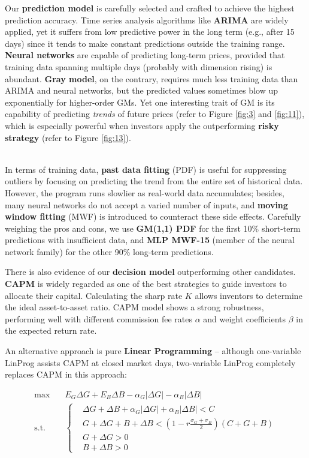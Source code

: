 \documentclass{mcmthesis}
\begin{document}
{	Our \textbf{prediction model} is carefully selected and crafted to achieve the highest prediction accuracy. Time series analysis algorithms like \textbf{ARIMA} are widely applied, yet it suffers from low predictive power in the long term (e.g., after 15 days) since it tends to make constant predictions outside the training range. \textbf{Neural networks} are capable of predicting long-term prices, provided that training data spanning multiple days (probably with dimension rising) is abundant. \textbf{Gray model}, on the contrary, requires much less training data than ARIMA and neural networks, but the predicted values sometimes blow up exponentially for higher-order GMs. Yet one interesting trait of GM is its capability of predicting \textit{trends} of future prices (refer to Figure \ref{fig:3} and \ref{fig:11}), which is especially powerful when investors apply the outperforming \textbf{risky strategy} (refer to Figure \ref{fig:13}). 
	
	~\\
	
	In terms of training data, \textbf{past data fitting} (PDF) is useful for suppressing outliers by focusing on predicting the trend from the entire set of historical data. However, the program runs slowlier as real-world data accumulates; besides, many neural networks do not accept a varied number of inputs, and \textbf{moving window fitting} (MWF) is introduced to counteract these side effects. Carefully weighing the pros and cons, we use \textbf{GM(1,1) PDF} for the first 10\% short-term predictions with insufficient data, and \textbf{MLP MWF-15} (member of the neural network family) for the other 90\% long-term predictions. 
	
	There is also evidence of our \textbf{decision model} outperforming other candidates. \textbf{CAPM} is widely regarded as one of the best strategies to guide investors to allocate their capital. Calculating the sharp rate $K$ allows inventors to determine the ideal asset-to-asset ratio. CAPM model shows a strong robustness, performing well with different commission fee rates $\alpha$ and weight coefficients $\beta$ in the expected return rate. 
	
	An alternative approach is pure \textbf{Linear Programming} -- although one-variable LinProg assists CAPM at closed market days, two-variable LinProg completely replaces CAPM in this approach: 
	
	$$
	\begin{aligned}
		\max \quad & E_G \Delta G + E_B \Delta B - \alpha_G |\Delta G| - \alpha_B |\Delta B| \\
		\textrm{s.t.} \quad & \left\{
		\begin{aligned}
			& \Delta G + \Delta B + \alpha_G |\Delta G| + \alpha_B |\Delta B| < C \\
			& G + \Delta G + B + \Delta B < \left(1-r\frac{\sigma_G+\sigma_B}{2}\right) \left(C+G+B\right) \\
			& G + \Delta G > 0 \\
			& B + \Delta B > 0
		\end{aligned}
		\right.
	\end{aligned}
	$$
	
}
\end{document}
